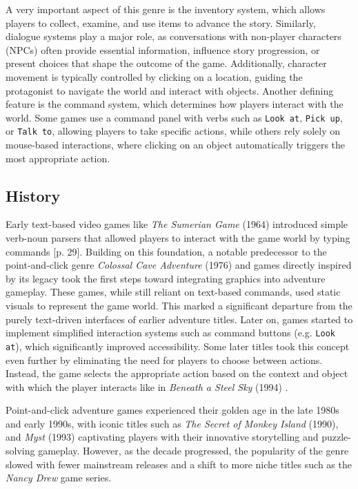 A very important aspect of this genre is the inventory system, which allows players to collect, examine, and use items to advance the story. Similarly, dialogue systems play a major role, as conversations with non-player characters (NPCs) often provide essential information, influence story progression, or present choices that shape the outcome of the game. Additionally, character movement is typically controlled by clicking on a location, guiding the protagonist to navigate the world and interact with objects. Another defining feature is the command system, which determines how players interact with the world. Some games use a command panel with verbs such as \texttt{Look at}, \texttt{Pick up}, or \texttt{Talk to}, allowing players to take specific actions, while others rely solely on mouse-based interactions, where clicking on an object automatically triggers the most appropriate action. 

\subsection{History}
Early text-based video games like \textit{The Sumerian Game} (1964) introduced simple verb-noun parsers that allowed players to interact with the game world by typing commands \cite{Salter2014}[p. 29]. Building on this foundation, a notable predecessor to the point-and-click genre \textit{Colossal Cave Adventure} (1976) and games directly inspired by its legacy took the first steps toward integrating graphics into adventure gameplay. These games, while still reliant on text-based commands, used static visuals to represent the game world. This marked a significant departure from the purely text-driven interfaces of earlier adventure titles. Later on, games started to implement simplified interaction systems such as command buttons (e.g. \texttt{Look at}), which significantly improved accessibility. Some later titles took this concept even further by eliminating the need for players to choose between actions. Instead, the game selects the appropriate action based on the context and object with which the player interacts like in \textit{Beneath a Steel Sky} (1994) \cite{Carton2023history}.

Point-and-click adventure games experienced their golden age in the late 1980s and early 1990s, with iconic titles such as \textit{The Secret of Monkey Island} (1990), and \textit{Myst} (1993) captivating players with their innovative storytelling and puzzle-solving gameplay. However, as the decade progressed, the popularity of the genre slowed \cite{Qaffas202022} with fewer mainstream releases and a shift to more niche titles such as the \textit{Nancy Drew} game series.

